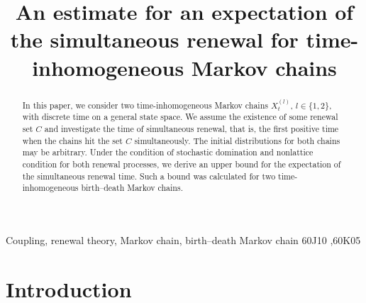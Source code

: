 \documentclass[numbers,compress,v1.0.1]{vmsta}
\theoremstyle{definition}
\begin{document}
%
\begin{frontmatter}

\title{An estimate for an expectation of the simultaneous renewal for time-inhomogeneous Markov chains}

\author{}

\address{Taras Shevchenko National University of Kyiv,\\
Faculty of Mechanics and Mathematics,\\
Department of Probability Theory, Statistics and Actuarial
Mathematics,\\
60 Volodymyrska Street, City of Kyiv, 01033, Ukraine}


\begin{abstract}
In this paper, we consider two time-inhomogeneous Markov chains
$X^{(l)}_t$, $l\in\{1,2\}$, with discrete time on a general state space.
We assume the existence of some renewal set $C$ and investigate the
time of simultaneous renewal, that is, the first positive time when the
chains hit the set $C$ simultaneously.
The initial distributions for both chains may be arbitrary.
Under the condition of stochastic domination and nonlattice condition
for both renewal processes, we derive
an upper bound for the expectation of the simultaneous renewal time.
Such a bound was calculated for two time-inhomogeneous birth--death
Markov chains.
\end{abstract}

\begin{keyword}
Coupling\sep
renewal theory\sep
Markov chain\sep
birth--death Markov chain
\MSC[2010] 60J10 \sep60K05
\end{keyword}


%
%
%
\end{frontmatter}

\section{Introduction}
\end{document}
